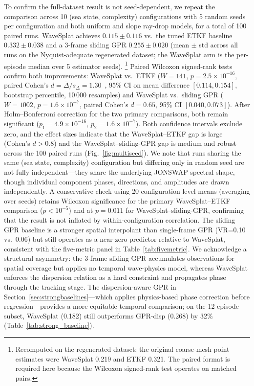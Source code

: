 To confirm the full-dataset result is not seed-dependent, we repeat
the comparison across 10 (sea state, complexity) configurations with
5 random seeds per configuration and both uniform and slope ray-drop
models, for a total of 100 paired runs.
WaveSplat achieves $0.115 \pm 0.116$ vs.\ the tuned ETKF baseline
$0.332 \pm 0.038$ and a 3-frame sliding GPR $0.255 \pm 0.020$
(mean $\pm$ std across all runs on the Nyquist-adequate regenerated
dataset; the WaveSplat arm is the per-episode median over 5 estimator
seeds).%
\footnote{Recomputed on the regenerated dataset; the original coarse-mesh
point estimates were WaveSplat 0.219 and ETKF 0.321.  The paired
format is required here because the Wilcoxon signed-rank test operates on
matched pairs.}
Paired Wilcoxon signed-rank tests~\citep{wilcoxon1945}
confirm both improvements:
WaveSplat vs.\ ETKF ($W\!=\!141$, $p\!=\!2.5\!\times\!10^{-16}$,
paired Cohen's $d\!=\!\bar{\Delta}/s_{\Delta}\!=\!1.30$~\citep{cohen1988},
95\% CI on mean difference
$[0.114, 0.154]$, bootstrap percentile, 10\,000 resamples)
and WaveSplat vs.\ sliding GPR ($W\!=\!1002$,
$p\!=\!1.6\!\times\!10^{-7}$, paired Cohen's $d\!=\!0.65$,
95\% CI $[0.040, 0.073]$).
After Holm--Bonferroni correction for the two primary comparisons,
both remain significant ($p_1{=}4.9\!\times\!10^{-16}$,
$p_2{=}1.6\!\times\!10^{-7}$).
Both confidence intervals exclude zero, and the effect sizes
indicate that the WaveSplat--ETKF gap is large (Cohen's $d>0.8$)
and the WaveSplat--sliding-GPR gap is medium and
robust across the 100 paired runs (Fig.~\ref{fig:multiseed}).
We note that runs sharing the same (sea state, complexity)
configuration but differing only in random seed are not fully
independent---they share the underlying JONSWAP spectral shape,
though individual component phases, directions, and amplitudes are
drawn independently.  A conservative check using 20
configuration-level means (averaging over seeds) retains Wilcoxon
significance for the primary WaveSplat--ETKF comparison
($p < 10^{-5}$) and at $p=0.011$ for WaveSplat--sliding-GPR,
confirming that the result is not
inflated by within-configuration correlation.
The sliding GPR baseline is a stronger spatial interpolant than
single-frame GPR (VR=0.10 vs.\ 0.06) but still operates as a
near-zero predictor relative to WaveSplat, consistent with the
five-metric panel in Table~\ref{tab:fivemetric}.
We acknowledge a structural asymmetry: the 3-frame sliding GPR
accumulates observations for spatial coverage but applies no temporal
wave-physics model, whereas WaveSplat enforces the dispersion relation
as a hard constraint and propagates phase through the tracking stage.
The dispersion-aware GPR in Section~\ref{sec:strongbaselines}---which
applies physics-based phase correction before regression---provides a
more equitable temporal comparison; on the 12-episode subset,
WaveSplat (0.182) still outperforms GPR-disp (0.268) by 32\%
(Table~\ref{tab:strong_baseline}).

